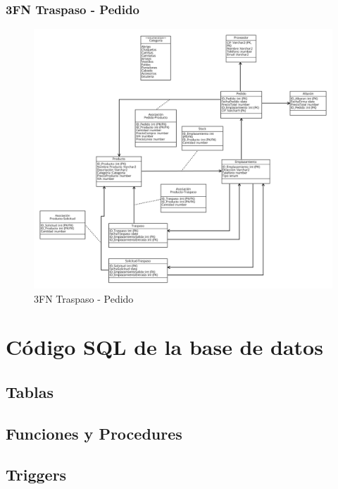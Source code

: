 \subsubsection{3FN Traspaso - Pedido}

\begin{figure}[H]
	\includegraphics[width=\linewidth]{images/3FN/3FN-traspaso-pedido.png}
	\caption{3FN Traspaso - Pedido}
\end{figure}

\section{Código SQL de la base de datos}

\subsection{Tablas}


\subsection{Funciones y Procedures}


\subsection{Triggers}



